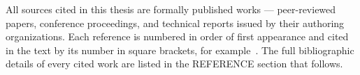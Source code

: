 \documentclass[../main.tex]{subfiles}
\begin{document}
All sources cited in this thesis are formally published works --- peer-reviewed papers,
conference proceedings, and technical reports issued by their authoring organizations.
Each reference is numbered in order of first appearance and cited in the text by its
number in square brackets, for example~\cite{ameisen2025circuit}. The full bibliographic
details of every cited work are listed in the REFERENCE section that follows.
\end{document}
